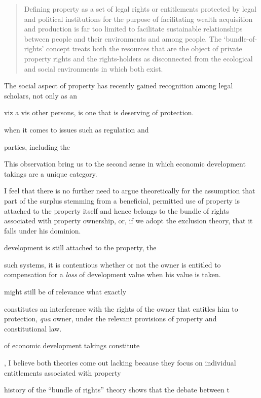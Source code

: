 \begin{quote}
Defining property as a set of legal rights or entitlements protected by legal and 
political institutions for the purpose of facilitating wealth acquisition and production
is far too limited to facilitate sustainable relationships between people and their
environments and among people.  The ‘bundle-of-rights’ concept treats both the
resources that are the object of private property rights and the rights-holders as
disconnected from the ecological and social environments in which both exist.
\end{quote}




The social aspect of property has recently gained recognition among legal scholars, not only as an

viz a vis other persons, is one that is deserving of protection.




 when it comes to issues such as regulation and 

parties, including the 

This observation bring us to the second sense in which economic development takings are a unique category. 


I feel that there is no further need to argue theoretically for the assumption that part of the surplus stemming from a beneficial, permitted use of property is attached to the property itself and hence belongs to the bundle of rights associated with property ownership, or, if we adopt the exclusion theory, that it falls under his dominion.




development is still attached to the property, the 


such systems, it is contentious whether or not the owner is entitled to compensation for a {\it loss} of development value when his value is taken. 


might still be of relevance what exactly

constitutes an interference with the rights of the owner that entitles him to protection, {\it qua} owner, under the relevant provisions of property and constitutional law. 

of economic development takings constitute 


, I believe both theories come out lacking because they focus on individual entitlements associated with property

 history of the ``bundle of rights'' theory shows that the debate between t


